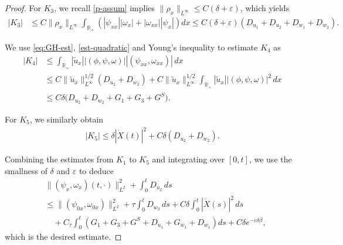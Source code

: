 \documentclass[11pt,reqno]{amsart}
\numberwithin{equation}{section} %
\begin{document}
\begin{proof}
For $K_3$, we recall \eqref{p-assum} implies $\|\rho_x\|_{L^\infty} \le C(\delta + \varepsilon)$, which yields
\begin{equation*}
\begin{aligned}
|K_3| &\le C \|\rho_x\|_{L^\infty} \int_{\mathbb{R}_+} \left( |\psi_{xx}||\omega_x| + |\omega_{xx}||\psi_x| \right) dx\le C (\delta + \varepsilon) \left( D_{u_1}+ D_{u_2} + D_{w_1} + D_{w_2} \right).
\end{aligned}
\end{equation*}

We use \eqref{eq:GH-est}, \eqref{est-quadratic} and Young's inequality to estimate $K_4$ as
\begin{equation*}
\begin{aligned}
|K_4| &\le \int_{\mathbb{R}_+}  |\tilde{u}_x| |(\phi,\psi,\omega)| |(\psi_{xx},\omega_{xx})| \, dx \\
&\le C\|\tilde{u}_x\|_{L^\infty}^{1/2} ( D_{u_2} +  D_{w_2} )+ C \|\tilde{u}_x\|_{L^\infty}^{1/2} \int_{\mathbb{R}_+} |\tilde{u}_x| |(\phi,\psi,\omega)|^2 \, dx \\
&\le C \delta \bigl(D_{u_2}+D_{w_2} +G_1+G_3 + G^S \bigr).
\end{aligned}
\end{equation*}

For $K_5$, we similarly obtain
\begin{equation*}
\begin{aligned}
|K_5| \le \delta |\dot{X}(t)|^2 + C \delta (D_{u_2} + D_{w_2} ).
\end{aligned}
\end{equation*}



Combining the estimates from $K_1$ to $K_5$ and integrating over $[0,t]$, we use the smallness of $\delta$ and $\varepsilon$ to deduce
\begin{equation*}
\begin{aligned}
&\|(\psi_x, \omega_x)(t,\cdot)\|_{L^2}^2 + \int_0^t D_{u_2} \,ds \\
&\le  \|(\psi_{0x}, \omega_{0x})\|_{L^2}^2 + \tau \int_0^t D_{w_2} \,ds + C\delta \int_0^t |\dot{X}(s)|^2 \,ds \\
&\quad + C_\tau \int_0^t \left(G_1 + G_3 + G^S+ D_{u_1} + G_{w_1} + D_{w_1}   \right) ds + C \delta e^{-c\delta \beta},
\end{aligned}
\end{equation*}
which is the desired estimate.


\end{proof}
\end{document}
